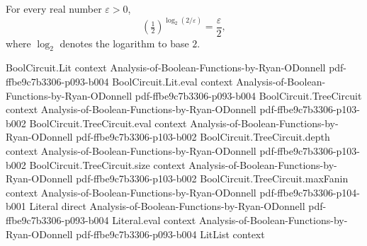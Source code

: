 \begin{lemma}
\label{LMN.two_pow_neg_logb_2_div_eps}
\leanok
{}
For every real number $\varepsilon > 0$,
\[
  \left(\tfrac{1}{2}\right)^{\log_2(2/\varepsilon)} = \frac{\varepsilon}{2},
\]
where $\log_2$ denotes the logarithm to base $2$.
\end{lemma}

\begin{lemma}
\label{LMN.iterative_reduction_bound}
\leanok
{}
\proofstep
  {BoolCircuit.Lit}
  {context}
  {Analysis-of-Boolean-Functions-by-Ryan-ODonnell}
  {pdf-ffbe9c7b3306-p093-b004}
\proofstep
  {BoolCircuit.Lit.eval}
  {context}
  {Analysis-of-Boolean-Functions-by-Ryan-ODonnell}
  {pdf-ffbe9c7b3306-p093-b004}
\proofstep
  {BoolCircuit.TreeCircuit}
  {context}
  {Analysis-of-Boolean-Functions-by-Ryan-ODonnell}
  {pdf-ffbe9c7b3306-p103-b002}
\proofstep
  {BoolCircuit.TreeCircuit.eval}
  {context}
  {Analysis-of-Boolean-Functions-by-Ryan-ODonnell}
  {pdf-ffbe9c7b3306-p103-b002}
\proofstep
  {BoolCircuit.TreeCircuit.depth}
  {context}
  {Analysis-of-Boolean-Functions-by-Ryan-ODonnell}
  {pdf-ffbe9c7b3306-p103-b002}
\proofstep
  {BoolCircuit.TreeCircuit.size}
  {context}
  {Analysis-of-Boolean-Functions-by-Ryan-ODonnell}
  {pdf-ffbe9c7b3306-p103-b002}
\proofstep
  {BoolCircuit.TreeCircuit.maxFanin}
  {context}
  {Analysis-of-Boolean-Functions-by-Ryan-ODonnell}
  {pdf-ffbe9c7b3306-p104-b001}
\proofstep
  {Literal}
  {direct}
  {Analysis-of-Boolean-Functions-by-Ryan-ODonnell}
  {pdf-ffbe9c7b3306-p093-b004}
\proofstep
  {Literal.eval}
  {context}
  {Analysis-of-Boolean-Functions-by-Ryan-ODonnell}
  {pdf-ffbe9c7b3306-p093-b004}
\proofstep
  {LitList}
  {context}

\end{lemma}
